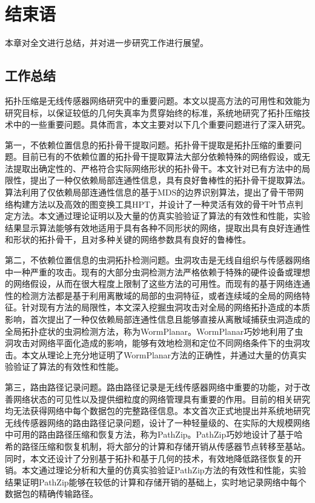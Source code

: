 \chapter{结束语}
\label{chap:7}
本章对全文进行总结，并对进一步研究工作进行展望。
\section{工作总结}
拓扑压缩是无线传感器网络研究中的重要问题。本文以提高方法的可用性和效能为研究目标，以保证较低的几何失真率为贯穿始终的标准，系统地研究了拓扑压缩技术中的一些重要问题。具体而言，本文主要对以下几个重要问题进行了深入研究。

第一，不依赖位置信息的拓扑骨干提取问题。拓扑骨干提取是拓扑压缩的重要问题。目前已有的不依赖位置的拓扑骨干提取算法大部分依赖特殊的网络假设，或无法提取出确定性的、严格符合实际网络形状的拓扑骨干。本文针对已有方法中的局限性，提出了一种仅依赖局部连通性信息，具有良好鲁棒性的拓扑骨干提取算法。算法利用了仅依赖局部连通性信息的基于MDS的边界识别算法，提出了骨干带网络构建方法以及高效的图变换工具HPT，并设计了一种灵活有效的骨干叶节点判定方法。本文通过理论证明以及大量的仿真实验验证了算法的有效性和性能，实验结果显示算法能够有效地适用于具有各种不同形状的网络，提取出具有良好连通性和形状的拓扑骨干，且对多种关键的网络参数具有良好的鲁棒性。

第二，不依赖位置信息的虫洞拓扑检测问题。虫洞攻击是无线自组织与传感器网络中一种严重的攻击。现有的大部分虫洞检测方法严格依赖于特殊的硬件设备或理想的网络假设，从而在很大程度上限制了这些方法的可用性。而现有的基于网络连通性的检测方法都是基于利用离散域的局部的虫洞特征，或者连续域的全局的网络特征。针对现有方法的局限性，本文深入挖掘虫洞攻击对全局的网络拓扑造成的本质影响，首次提出了一种仅依赖局部连通性信息且能够直接从离散域捕获虫洞造成的全局拓扑症状的虫洞检测方法，称为WormPlanar。WormPlanar巧妙地利用了虫洞攻击对网络平面化造成的影响，能够有效地检测和定位不同网络条件下的虫洞攻击。本文从理论上充分地证明了WormPlanar方法的正确性，并通过大量的仿真实验验证了算法的有效性和性能。

第三，路由路径记录问题。路由路径记录是无线传感器网络中重要的功能，对于改善网络状态的可见性以及提供细粒度的网络管理具有重要的作用。目前的相关研究均无法获得网络中每个数据包的完整路径信息。本文首次正式地提出并系统地研究无线传感器网络的路由路径记录问题，设计了一种轻量级的、在实际的大规模网络中可用的路由路径压缩和恢复方法，称为PathZip。PathZip巧妙地设计了基于哈希的路径压缩和恢复机制，将大部分的计算和存储开销从传感器节点转移至基站。同时，本文还设计了分别基于拓扑和基于几何的技术，有效地降低路径恢复的开销。本文通过理论分析和大量的仿真实验验证PathZip方法的有效性和性能，实验结果证明PathZip能够在较低的计算和存储开销的基础上，实时地记录网络中每个数据包的精确传输路径。

